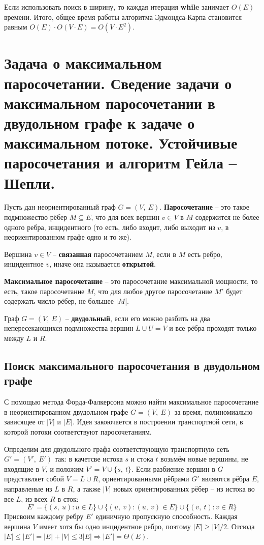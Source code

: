 \documentclass[a4paper,12pt]{article}
\begin{document}
Если использовать поиск в ширину, то каждая итерация \textbf{while} занимает $O(E)$ времени. Итого, общее время работы алгоритма Эдмондса-Карпа становится равным $O(E) \cdot O(V \cdot E) = O(V \cdot E^2)$.
\newpage
\section{Задача о максимальном паросочетании. Сведение задачи о максимальном паросочетании в двудольном графе к задаче о максимальном потоке. Устойчивые паросочетания и алгоритм Гейла – Шепли.}

\begin{definition}
    Пусть дан неориентированный граф $G = (V,\ E)$. \textbf{Паросочетание} -- это такое подмножество рёбер $M \subseteq E$, что для всех вершин $v \in V$ в $M$ содержится не более одного ребра, инцидентного (то есть, либо входит, либо выходит из $v$, в неориентированном графе одно и то же). 
    
    Вершина $v \in V$ -- \textbf{связанная} паросочетанием $M$, если в $M$ есть ребро, инцидентное $v$, иначе она называется  \textbf{открытой}.
    
    \textbf{Максимальное паросочетание} -- это паросочетание максимальной мощности, то есть, такое паросочетание $M$, что для любое другое паросочетание $M'$ будет содержать число рёбер, не большее $|M$|.
\end{definition}

\begin{definition}
    Граф $G = (V,\ E)$ -- \textbf{двудольный}, если его можно разбить на два непересекающихся подмножества вершин $L \cup U = V$ и все рёбра проходят только между $L$ и $R$.
\end{definition}

\subsection{Поиск максимального паросочетания в двудольном графе}

С помощью метода Форда-Фалкерсона можно найти максимальное паросочетание в неориентированном двудольном графе $G = (V,\ E)$ за время, полиномиально зависящее от $|V|$ и $|E|$. Идея закоючается в построении транспортной сети, в которой потоки соответствуют паросочетаниям. 

Определим для двудольного графа соответствующую транспортную сеть $G' = (V',\ E')$ так: в качетсве истока $s$ и стока $t$ возьмём новые вершины, не входящие в  $V$, и положим $V' = V \cup \{s,\ t\}$. Если разбиение вершин в $G$ представляет собой $V = L \cup R$, ориентированными рёбрами $G'$ являются рёбра $E$, направленые из $L$ в $R$, а также $|V|$ новых ориентированных рёбер -- из истока во все $L$, из всех $R$ в сток:\[E' = \{(s,\ u) : u \in L\} \cup \{(u,\ v) : (u,\ v) \in E\} \cup \{(v,\ t) : v \in R\}\]
Присвоим каждому ребру $E'$ единичную пропускную способность. Каждая вершина $V$ имеет хотя бы одно инцидентное ребро, поэтому $|E| \geqslant |V|\slash 2$. Отсюда $|E| \leqslant |E'| = |E| + |V| \leqslant 3|E| \Rightarrow |E'| = \Theta(E)$.
\end{document}
